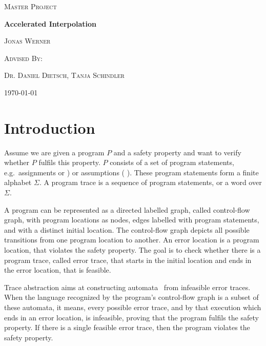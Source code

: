 \documentclass{article}
\newcommand{\tikzstmt}[3]{{%
\tikz[baseline]{%
	\node[st,fill=#2] at (0,.64ex){%
	\hspace{.3em}\texttt{\strut#3#1}\hspace{.3em}\strut};}
}}
\newcommand{\stfootcol}[2]{\tikzstmt{#1}{#2}{\footnotesize}}
\newcommand{\stfoot}[1]{\stfootcol{#1}{stmtcolor}}
\newcommand{\st}[1]{\stfoot{#1}}
\newcommand\mycom[1]{}
\newcommand\mycom[1]{#1}
\newcommand{\dd}[1]{\mycom{\todo[color=orange!40,inline]{\small DD: #1}}}
\newcommand{\ts}[1]{\mycom{\todo[color=green!40,inline]{\small TS: #1}}}
\begin{document}
\newcommand{\HorizontalLine}{\rule{\linewidth}{0.3mm}}

\begin{center}
	{\scshape\Large Master Project \par}
	\vspace{1.5cm}
	{\huge\bfseries Accelerated Interpolation \par}
	\vspace{1cm}
	{\large \scshape Jonas Werner\par}
	\vspace{0.5cm}
	{\large \scshape Advised By: \par}
	{\large \scshape Dr. Daniel Dietsch, Tanja Schindler \par}
	\vspace{0.5cm}
	{\today \vspace{2cm}}
\end{center}

\section{Introduction}
Assume we are given a program $P$ and a safety property and want to verify whether $P$ fulfils this property.
$P$ consists of a set of program statements, e.g.\ assignments \st{x:=0} or \st{havoc x}) or assumptions (\st{x!=42}).
These program statements form a finite alphabet $\Sigma$.
A program trace is a sequence of program statements, or a word over $\Sigma$.

A program can be represented as a directed labelled graph, called control-flow graph, with program locations as nodes, edges labelled with program statements, and with a distinct initial location.
The control-flow graph depicts all possible transitions from one program location to another.
An error location is a program location, that violates the safety property.\ts{How does a location violate a property? Explain error location. In the beginning, you are given a program and a safety property - how is this connected to the error location?}
The goal is to check whether there is a program trace, called error trace, that starts in the initial location and ends in the error location, that is feasible.

Trace abstraction aims at constructing automata~\cite{10.1007/978-3-642-39799-8_2} from infeasible error traces. \dd{Is this a good description of TA?}
When the language recognized by the program's control-flow graph\dd{How can a graph recognize a language?} is a subset of these automata, it means, every possible error trace, and by that execution which ends in an error location, is infeasible\dd{what is an infeasible execution?}, proving that the program fulfils the safety property.
If there is a single feasible error trace, then the program violates the safety property.\dd{what is another word for feasible? Usually, we need to define (in)feasability before using it, so if you can find a better one the intro up to this point will make more sense}
\end{document}
